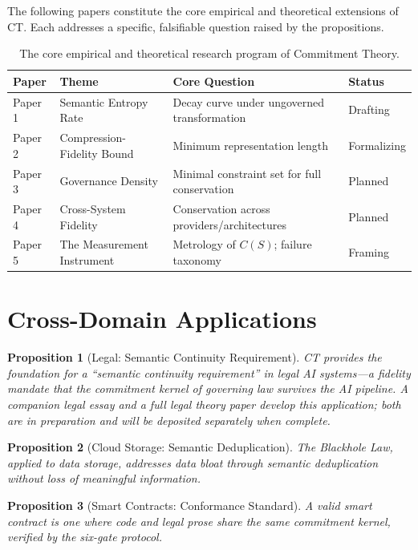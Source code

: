 \documentclass[11pt,a4paper]{article}
\newtheorem{proposition}{Proposition}[section]
\begin{document}
The following papers constitute the core empirical and theoretical extensions of CT. Each addresses a specific, falsifiable question raised by the propositions.

\begin{table}[htbp]
\centering
\small
\renewcommand{\arraystretch}{1.3}
\begin{tabular}{@{}llll@{}}
\toprule
\textbf{Paper} & \textbf{Theme} & \textbf{Core Question} & \textbf{Status} \\
\midrule
Paper 1 & Semantic Entropy Rate & Decay curve under ungoverned transformation & Drafting \\
Paper 2 & Compression-Fidelity Bound & Minimum representation length & Formalizing \\
Paper 3 & Governance Density & Minimal constraint set for full conservation & Planned \\
Paper 4 & Cross-System Fidelity & Conservation across providers/architectures & Planned \\
Paper 5 & The Measurement Instrument & Metrology of $C(S)$; failure taxonomy & Framing \\
\bottomrule
\end{tabular}
\caption{The core empirical and theoretical research program of Commitment Theory.}
\end{table}

\section{Cross-Domain Applications}

\begin{proposition}[Legal: Semantic Continuity Requirement]
CT provides the foundation for a ``semantic continuity requirement'' in legal AI systems---a fidelity mandate that the commitment kernel of governing law survives the AI pipeline. A companion legal essay and a full legal theory paper develop this application; both are in preparation and will be deposited separately when complete.
\end{proposition}

\begin{proposition}[Cloud Storage: Semantic Deduplication]
The Blackhole Law, applied to data storage, addresses data bloat through semantic deduplication without loss of meaningful information.
\end{proposition}

\begin{proposition}[Smart Contracts: Conformance Standard]
A valid smart contract is one where code and legal prose share the same commitment kernel, verified by the six-gate protocol.
\end{proposition}
\end{document}
